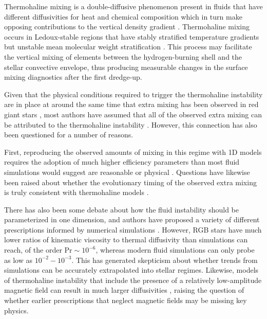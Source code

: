 Thermohaline mixing is a double-diffusive phenomenon present in fluids that have different diffusivities for heat and chemical composition which in turn make opposing contributions to the vertical density gradient \citep{Turner:1974}. Thermohaline mixing occurs in Ledoux-stable regions that have stably stratified temperature gradients but unstable mean molecular weight stratification \citep[see][for a full review]{garaud_DDC_review_2018}. This process may facilitate the vertical mixing of elements between the hydrogen-burning shell and the stellar convective envelope, thus producing measurable changes in the surface mixing diagnostics after the first dredge-up. 

Given that the physical conditions required to trigger the thermohaline instability are in place at around the same time that extra mixing has been observed in red giant stars \citep[e.g.][]{Lagarde2015}, most authors have assumed that all of the observed extra mixing can be attributed to the thermohaline instability \citep[e.g.][]{Kirby2016, Charbonnel2020, Magrini2021a}. However, this connection has also been questioned for a number of reasons. 

First, reproducing the observed amounts of mixing in this regime with 1D models requires the adoption of much higher efficiency parameters than most fluid simulations would suggest are reasonable or physical \citep{Denissenkov2010thermohaline, denissenkov_merryfield_2011, traxler_etal_2011, brown_etal_2013}. Questions have likewise been raised about whether the evolutionary timing of the observed extra mixing is truly consistent with thermohaline models \citep[see e.g.][]{Angelou2015, Henkel2017, TayarJoyce22}.

There has also been some debate about how the fluid instability should be parameterized in one dimension, and authors have proposed a variety of different prescriptions informed by numerical simulations \citep[e.g.~][]{traxler_etal_2011,brown_etal_2013}. However, RGB stars have much lower ratios of kinematic viscosity to thermal diffusivity than simulations can reach, of the order $\mathrm{Pr} \sim 10^{-6}$, whereas modern fluid simulations can only probe as low as $10^{-2} - 10^{-3}$. This has generated skepticism about whether trends from simulations can be accurately extrapolated into stellar regimes. Likewise, models of thermohaline instability that include the presence of a relatively low-amplitude magnetic field can result in much larger diffusivities \citep{harrington}, raising the question of whether earlier prescriptions that neglect magnetic fields may be missing key physics. 



